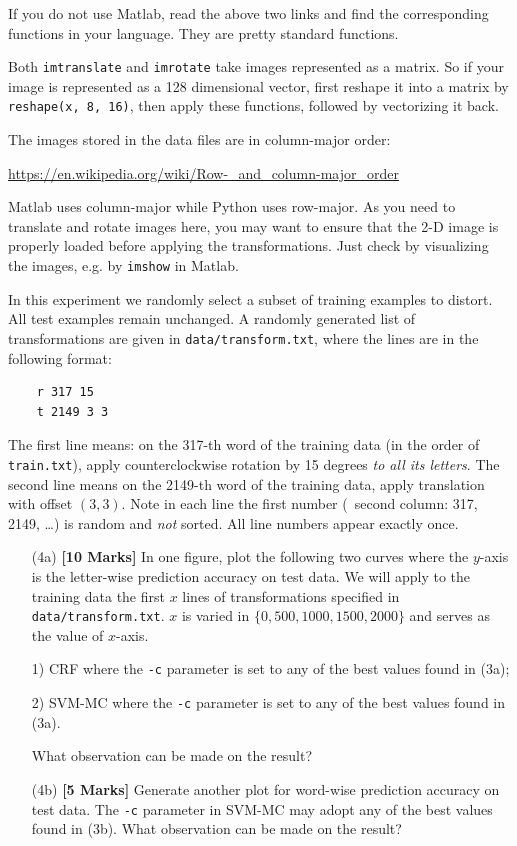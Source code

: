 \documentclass[11pt]{report}
\begin{document}
	If you do not use Matlab, read the above two links and find the corresponding functions in your language.  
	They are pretty standard functions.	
	
	Both \verb#imtranslate# and \verb#imrotate# take images represented as a matrix.
	So if your image is represented as a 128 dimensional vector,
	first reshape it into a matrix by \verb#reshape(x, 8, 16)#,
	then apply these functions,
	followed by vectorizing it back.
	
	The images stored in the data files are in column-major order:
	
	\href{https://en.wikipedia.org/wiki/Row-_and_column-major_order}{https://en.wikipedia.org/wiki/Row-\_and\_column-major\_order}
	
	Matlab uses column-major while Python uses row-major.
	As you need to translate and rotate images here, 
	you may want to ensure that the 2-D image is properly loaded before applying the transformations.  
	Just check by visualizing the images, e.g. by \verb#imshow# in Matlab.	
	
	In this experiment
	we randomly select a subset of training examples to distort.
	All test examples remain unchanged.
	A randomly generated list of transformations are given in \verb#data/transform.txt#, where the lines are in the following format:
	\begin{verbatim}
	r 317 15
	t 2149 3 3
	\end{verbatim}
	The first line means: on the 317-th word of the training data (in the order of \verb#train.txt#),
	apply counterclockwise rotation by 15 degrees \emph{to all its letters}.
	The second line means on the 2149-th word of the training data, apply translation with offset $(3,3)$.
	Note in each line the first number (\ie\ second column: 317, 2149, \ldots) is random and \emph{not} sorted.
	All line numbers appear exactly once.
	
	\begin{itemize}
		\item[(4a)] {\bf [10 Marks]} In one figure, plot the following two curves where the $y$-axis is the letter-wise prediction accuracy on test data.  We will apply to the training data the first $x$ lines of transformations specified in \verb#data/transform.txt#.  $x$ is varied in $\{0, 500, 1000, 1500, 2000\}$ and serves as the value of $x$-axis.
		
		1) CRF where the \verb#-c# parameter is set to any of the best values found in (3a);
		
		2) SVM-MC where the \verb#-c# parameter is set to any of the best values found in (3a).
		
		What observation can be made on the result?
		
		\item[(4b)] {\bf [5 Marks]}  Generate another plot for word-wise prediction accuracy on test data.  The \verb#-c# parameter in SVM-MC may adopt any of the best values found in (3b).
		What observation can be made on the result?
		
	\end{itemize}
\end{document}
